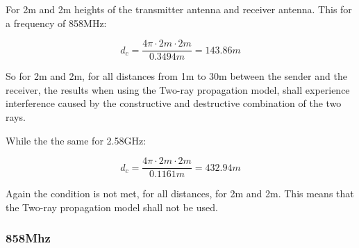 For 2m and 2m heights of the transmitter antenna and receiver antenna. This for a frequency of 858MHz:

\begin{equation}
d_{c} = \frac{4\pi \cdot 2m \cdot 2m}{0.3494m} = 143.86m
\label{critical_fac_dc_calc_2_2_858MHz}
\end{equation}

So for 2m and 2m, for all distances from 1m to 30m between the sender and the receiver, the results when using the Two-ray propagation model, shall experience interference caused by the constructive and destructive combination of the two rays.

While the the same for 2.58GHz:

\begin{equation}
d_{c} = \frac{4\pi \cdot 2m \cdot 2m}{0.1161m} = 432.94m
\label{critical_fac_dc_calc_2_2_2.58GHz}
\end{equation}

Again the condition is not met, for all distances, for 2m and 2m. This means that the Two-ray propagation model shall not be used.









\subsubsection{858Mhz}

